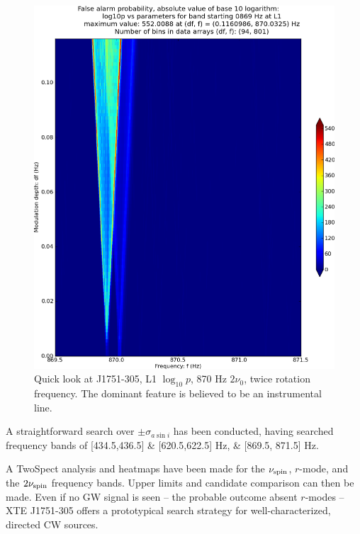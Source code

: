 \begin{figure}
\begin{center}
\includegraphics[width=0.68\paperwidth,height=0.48\paperheight]{plots/DFvsFresultsProb-L1_pulsar-0869.eps}
\caption{
Quick look at J1751-305, L1 $\log_{10}p$, 870 Hz $2\nu_0$, twice rotation frequency. The dominant feature is believed to be an instrumental line.}
\end{center}
\end{figure}

A straightforward search over $\pm \sigma_{a \sin i}$ has been conducted, having
searched frequency bands of [434.5,436.5] \& [620.5,622.5] Hz, \& [869.5, 871.5] Hz.


A TwoSpect analysis and heatmaps have been made for the $\nu_\textup{spin}$, $r$-mode, and the $2\nu_\textup{spin}$ frequency bands.
Upper limits and candidate comparison can then be made.
Even if no GW signal is seen -- the probable outcome absent $r$-modes -- XTE J1751-305 offers a prototypical search strategy for well-characterized, directed CW sources.


